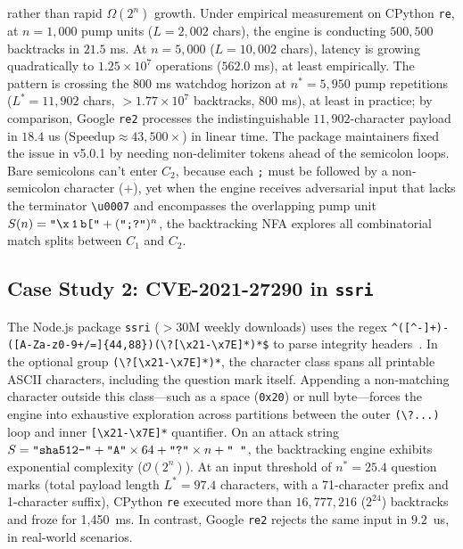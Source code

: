 \documentclass{ieeeaccess}
\begin{document}
rather than rapid $\Omega(2^n)$ growth. Under empirical measurement on CPython \texttt{re}, at $n = 1{,}000$ pump units ($L = 2{,}002$ chars), the engine is conducting $500{,}500$ backtracks in $21.5$ ms. At $n = 5{,}000$ ($L = 10{,}002$ chars), latency is growing quadratically to $1.25 \times 10^7$ operations ($562.0$ ms), at least empirically. The pattern is crossing the 800 ms watchdog horizon at $n^* = 5{,}950$ pump repetitions ($L^* = 11{,}902$ chars, $>1.77 \times 10^7$ backtracks, 800 ms), at least in practice; by comparison, Google \texttt{re2} processes the indistinguishable $11{,}902$-character payload in $18.4$ us ($\mathrm{Speedup} \approx 43{,}500\times$) in linear time. The package maintainers fixed the issue in v5.0.1 by needing non-delimiter tokens ahead of the semicolon loops. Bare semicolons can't enter $C_2$, because each \texttt{;} must be followed by a non-semicolon character ($+$), yet when the engine receives adversarial input that lacks the terminator \texttt{\textbackslash u0007} and encompasses the overlapping pump unit $S(n) = \text{\texttt{"\textbackslash x\hspace{1.8pt}1\hspace{1.8pt}b["}} + (\text{\texttt{";?"}})^n$, the backtracking NFA explores all combinatorial match splits between $C_1$ and $C_2$.

\subsection{Case Study 2: CVE-2021-27290 in \texttt{ssri}}
The Node.js package \texttt{ssri} ($>30$M weekly downloads) uses the regex \texttt{\^{}([{\^{}}-]+)\allowbreak{}-([A-Za-z0-9+/=]\{44,88\})\allowbreak{}(\textbackslash ?[\textbackslash x21-\textbackslash x7E]*)\allowbreak{}*\$} to parse integrity headers~\cite{cve_2021_27290}. In the optional group \texttt{(\textbackslash ?[\textbackslash x21-\textbackslash x7E]*)\allowbreak{}*}, the character class spans all printable ASCII characters, including the question mark itself. Appending a non-matching character outside this class---such as a space (\texttt{0x20})\allowbreak{} or null byte---forces the engine into exhaustive exploration across partitions between the outer \texttt{(\textbackslash ?...)\allowbreak{}} loop and inner \texttt{[\textbackslash x21-\textbackslash x7E]*} quantifier. On an attack string $S = \text{\texttt{"sha512-"}} + \text{\texttt{"A"}} \times 64 + \text{\texttt{"?"}} \times n + \text{\texttt{" "}}$, the backtracking engine exhibits exponential complexity ($\mathcal{O}(2^n)\allowbreak{}$)\allowbreak{}. At an input threshold of $n^* = 25.4$ question marks (total payload length $L^* = 97.4$ characters, with a 71-character prefix and 1-character suffix)\allowbreak{}, CPython \texttt{re} executed more than $16{,}777{,}216$ ($2^{24}$)\allowbreak{} backtracks and froze for 1,450~ms. In contrast, Google \texttt{re2} rejects the same input in $9.2$~us, in real-world scenarios.
\end{document}
